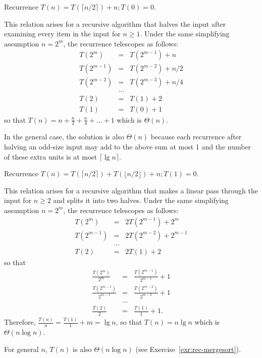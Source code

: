 \begin{Example} \label{exm:recur:c}
Recurrence $T(n)=T(\lceil n/2\rceil )+n; T(0)=0$.

This relation arises for a
recursive algorithm that halves the input after
examining every item in the input for \(n \ge 1\).
Under the same simplifying assumption $n=2^{m}$,
the recurrence telescopes as follows:
\begin{eqnarray*}
    T(2^{m}) & = & T(2^{m-1}) + n\\
    T(2^{m-1}) & = & T(2^{m-2}) + n/2\\
    T(2^{m-2}) & = & T(2^{m-3}) + n/4\\
           &\ldots & \\
    T(2)   & = & T(1) +2\\
    T(1)   & = & T(0) +1
\end{eqnarray*}
so that $T(n)=n+\frac{n}{2}+\frac{n}{4}+\ldots+1$ 
which is $\Theta(n)$.

In the general case, the solution is also $\Theta(n)$ because
each recurrence after halving an odd-size input may
add to the above sum at most 1 and the number of these
extra units is at most \(\lceil \lg n \rceil\). 
\end{Example}

\begin{Example} \label{exm:recur:d}
Recurrence $T(n)= T(\lceil n/2 \rceil)+T(\lfloor n/2 \rfloor) + n; T(1)=0$. 

This relation arises for a
recursive algorithm that makes a linear pass through 
the input for \(n \ge 2\) and splits it into two halves.
Under the same simplifying assumption $n=2^{m}$,
the recurrence telescopes as follows:
\begin{eqnarray*}
    T(2^{m}) & = & 2 T(2^{m-1}) + 2^{m}\\
    T(2^{m-1}) & = & 2 T(2^{m-2}) + 2^{m-1}\\
           &\ldots & \\
    T(2)  & = & 2 T(1) + 2
\end{eqnarray*}
so that
\begin{eqnarray*}
  \frac { T(2^{m}) } { 2^{m} } & = & \frac { T(2^{m-1}) } {2^{m-1} } + 1\\
  \frac { T(2^{m-1}) } { 2^{m-1} }& = & \frac{ T(2^{m-2})} { 2^{m-2} } + 1\\
           &\ldots & \\
  \frac { T(2) }{ 2 }   & = & \frac{ T(1)}{ 1 } +1.
\end{eqnarray*}
Therefore, $\frac{T(n)}{n} = \frac{T(1)}{1} + m = \lg n$, so that
$T(n) = n \lg n$ which is $\Theta(n \log n)$.

For general $n$, $T(n)$ is also $\Theta(n \log n)$ (see Exercise~\ref{exr:rec-mergesort}).
\end{Example}


